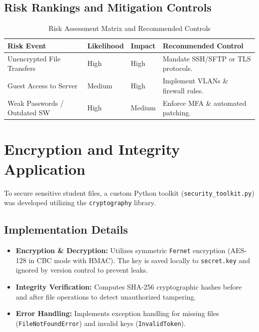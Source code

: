 \documentclass[12pt,a4paper]{article}
\begin{document}
\subsection{Risk Rankings and Mitigation Controls}
\begin{table}[h!]
\centering
\small
\begin{tabular}{@{}llll@{}}
\toprule
\textbf{Risk Event} & \textbf{Likelihood} & \textbf{Impact} & \textbf{Recommended Control} \\ \midrule
Unencrypted File Transfers & High & High & Mandate SSH/SFTP or TLS protocols. \\
Guest Access to Server & Medium & High & Implement VLANs \& firewall rules. \\
Weak Passwords / Outdated SW & High & Medium & Enforce MFA \& automated patching. \\ \bottomrule
\end{tabular}
\caption{Risk Assessment Matrix and Recommended Controls}
\end{table}

\section{Encryption and Integrity Application}
To secure sensitive student files, a custom Python toolkit (\texttt{security\_toolkit.py}) was developed utilizing the \texttt{cryptography} library.

\subsection{Implementation Details}
\begin{itemize}
    \item \textbf{Encryption \& Decryption:} Utilizes symmetric \texttt{Fernet} encryption (AES-128 in CBC mode with HMAC). The key is saved locally to \texttt{secret.key} and ignored by version control to prevent leaks.
    \item \textbf{Integrity Verification:} Computes SHA-256 cryptographic hashes before and after file operations to detect unauthorized tampering.
    \item \textbf{Error Handling:} Implements exception handling for missing files (\texttt{FileNotFoundError}) and invalid keys (\texttt{InvalidToken}).
\end{itemize}
\end{document}
